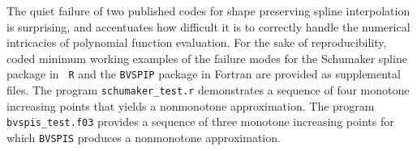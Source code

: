 
\beginred


The quiet failure of two published codes for shape preserving spline
interpolation is surprising, and accentuates how difficult it is to
correctly handle the numerical intricacies of polynomial function
evaluation. For the sake of reproducibility, coded minimum working
examples of the failure modes for the Schumaker spline package in {\tt
  R} and the {\tt BVSPIP} package in Fortran are provided as
supplemental files. The program {\tt schumaker\_test.r} demonstrates a
sequence of four monotone increasing points that yields a nonmonotone
approximation. The program {\tt bvspis\_test.f03} provides a sequence
of three monotone increasing points for which {\tt BVSPIS} produces a
nonmonotone approximation.

\endred
